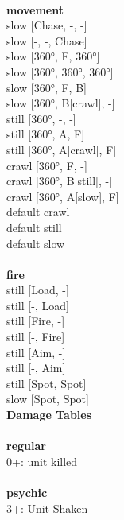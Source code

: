 \ \\ {\bf movement } \\
slow [Chase, -, -] \\
slow [-, -, Chase] \\
slow [360°, F, 360°] \\
slow [360°, 360°, 360°] \\
slow [360°, F, B] \\
slow [360°, B[crawl], -] \\
still [360°, -, -] \\
still [360°, A, F] \\
still [360°, A[crawl], F] \\
crawl [360°, F, -] \\
crawl [360°, B[still], -] \\
crawl [360°, A[slow], F] \\
default crawl \\
default still \\
default slow \\
\ \\ {\bf fire } \\
still [Load, -] \\
still [-, Load] \\
still [Fire, -] \\
still [-, Fire] \\
still [Aim, -] \\
still [-, Aim] \\
still [Spot, Spot] \\
slow [Spot, Spot] \\


{\bf Damage Tables} \\
\ \\ {\bf regular } \\
0+: unit killed \\
\ \\ {\bf psychic } \\
3+: Unit Shaken \\










